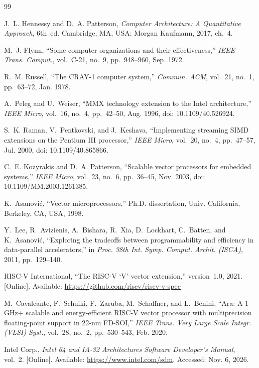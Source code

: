 \documentclass[conference]{IEEEtran}
\begin{document}
\begin{thebibliography}{99}

 J.~L. Hennessy and D.~A. Patterson, \emph{Computer Architecture: A
Quantitative Approach}, 6th~ed. Cambridge, MA, USA: Morgan Kaufmann, 2017, ch.~4.

 M.~J. Flynn, ``Some computer organizations and their effectiveness,''
\emph{IEEE Trans. Comput.}, vol.~C-21, no.~9, pp.~948--960, Sep. 1972.

 R.~M. Russell, ``The CRAY-1 computer system,''
\emph{Commun. ACM}, vol.~21, no.~1, pp.~63--72, Jan. 1978.

 A.~Peleg and U.~Weiser, ``MMX technology extension to the Intel
architecture,'' \emph{IEEE Micro}, vol.~16, no.~4, pp.~42--50, Aug. 1996,
doi: 10.1109/40.526924.

 S.~K. Raman, V.~Pentkovski, and J.~Keshava, ``Implementing streaming
SIMD extensions on the Pentium III processor,'' \emph{IEEE Micro}, vol.~20, no.~4,
pp.~47--57, Jul. 2000, doi: 10.1109/40.865866.

 C.~E. Kozyrakis and D.~A. Patterson, ``Scalable vector processors
for embedded systems,'' \emph{IEEE Micro}, vol.~23, no.~6, pp.~36--45, Nov. 2003,
doi: 10.1109/MM.2003.1261385.

 K.~Asanovi\'c, ``Vector microprocessors,'' Ph.D. dissertation,
Univ. California, Berkeley, CA, USA, 1998.

 Y.~Lee, R.~Avizienis, A.~Bishara, R.~Xia, D.~Lockhart, C.~Batten,
and K.~Asanovi\'c, ``Exploring the tradeoffs between programmability and efficiency
in data-parallel accelerators,'' in \emph{Proc. 38th Int. Symp. Comput. Archit.
(ISCA)}, 2011, pp.~129--140.

 RISC-V International, ``The RISC-V `V' vector extension,''
version~1.0, 2021. [Online]. Available: \url{https://github.com/riscv/riscv-v-spec}

 M.~Cavalcante, F.~Schuiki, F.~Zaruba, M.~Schaffner, and L.~Benini,
``Ara: A 1-GHz+ scalable and energy-efficient RISC-V vector processor with
multiprecision floating-point support in 22-nm FD-SOI,'' \emph{IEEE Trans. Very
Large Scale Integr. (VLSI) Syst.}, vol.~28, no.~2, pp.~530--543, Feb. 2020.

 Intel Corp., \emph{Intel 64 and IA-32 Architectures Software
Developer's Manual}, vol.~2. [Online]. Available: \url{https://www.intel.com/sdm}.
Accessed: Nov. 6, 2026.


\end{thebibliography}
\end{document}
